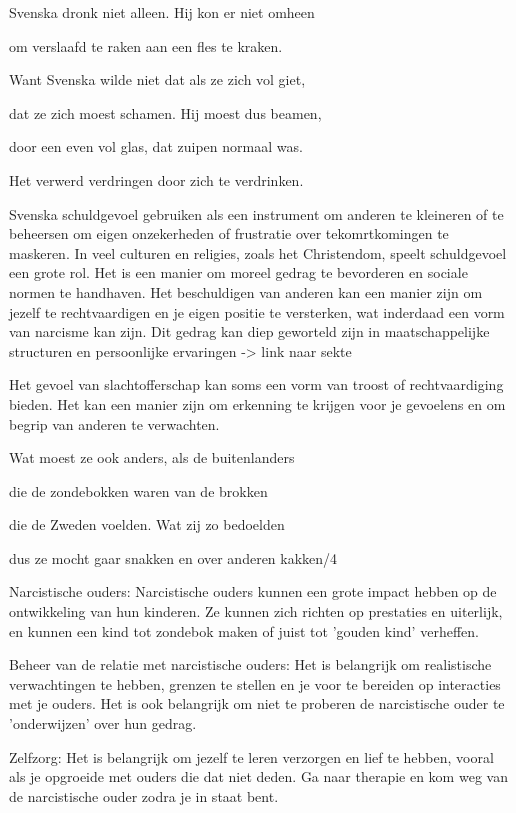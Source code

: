Svenska dronk niet alleen.
Hij kon er niet omheen

om verslaafd te raken
aan een fles te kraken.

Want Svenska wilde niet
dat als ze zich vol giet,

dat ze zich moest schamen.
Hij moest dus beamen,

door een even vol glas,
dat zuipen normaal was.

Het verwerd verdringen
door zich te verdrinken.

Svenska  schuldgevoel gebruiken als een instrument om anderen te kleineren of te beheersen om eigen onzekerheden of frustratie over tekomrtkomingen te maskeren.
In veel culturen en religies, zoals het Christendom, speelt schuldgevoel een grote rol. Het is een manier om moreel gedrag te bevorderen en sociale normen te handhaven. Het beschuldigen van anderen kan een manier zijn om jezelf te rechtvaardigen en je eigen positie te versterken, wat inderdaad een vorm van narcisme kan zijn. Dit gedrag kan diep geworteld zijn in maatschappelijke structuren en persoonlijke ervaringen -> link naar sekte

Het gevoel van slachtofferschap kan soms een vorm van troost of rechtvaardiging bieden. Het kan een manier zijn om erkenning te krijgen voor je gevoelens en om begrip van anderen te verwachten.

Wat moest ze ook anders,
als de buitenlanders

die de zondebokken
waren van de brokken

die de Zweden voelden.
Wat zij zo bedoelden

dus ze mocht gaar snakken
en over anderen kakken/4

Narcistische ouders: Narcistische ouders kunnen een grote impact hebben op de ontwikkeling van hun kinderen. Ze kunnen zich richten op prestaties en uiterlijk, en kunnen een kind tot zondebok maken of juist tot 'gouden kind' verheffen.

Beheer van de relatie met narcistische ouders: Het is belangrijk om realistische verwachtingen te hebben, grenzen te stellen en je voor te bereiden op interacties met je ouders. Het is ook belangrijk om niet te proberen de narcistische ouder te 'onderwijzen' over hun gedrag.

Zelfzorg: Het is belangrijk om jezelf te leren verzorgen en lief te hebben, vooral als je opgroeide met ouders die dat niet deden. Ga naar therapie en kom weg van de narcistische ouder zodra je in staat bent.

